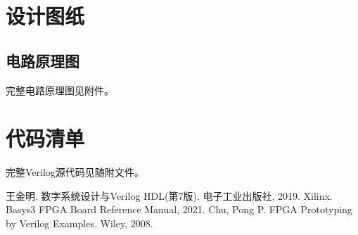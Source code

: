 \documentclass[12pt, a4paper]{ctexart}
\begin{document}



\appendix
\section{\centering 设计图纸}
\subsection*{电路原理图}
完整电路原理图见附件。

\section{\centering 代码清单}
完整Verilog源代码见随附文件。

\begin{thebibliography}{99}
 王金明. 数字系统设计与Verilog HDL(第7版). 电子工业出版社, 2019.
 Xilinx. Basys3 FPGA Board Reference Manual, 2021.
 Chu, Pong P. FPGA Prototyping by Verilog Examples. Wiley, 2008.
\end{thebibliography}
\end{document}
